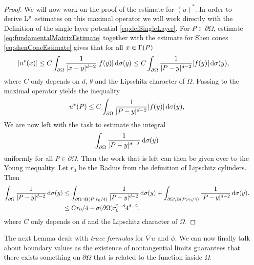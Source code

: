 \begin{proof}
  We will now work on the proof of the estimate for $(u)^*$.
  In order to derive $\mathrm{L}^p$ estimates on this maximal operator we will work directly with the Definition of the single layer potential \eqref{eq:defSingleLayer}.
  For $P \in \partial\Omega$, estimate \eqref{eq:fundamentalMatrixEstimate} together with the estimate for Shen cones \eqref{eq:shenConeEstimate} gives that for all $x \in \Gamma(P)$
  \begin{align*}
    |u^*(x)| 
    &\leq  C \int_{\partial\Omega} \frac{1}{|x - y|^{d - 2}} |f(y)| \, {\operatorname{d}\!{\sigma}}(y) 
    \leq  C \int_{\partial\Omega} \frac{1}{|P - y|^{d - 2}} |f(y)| \, {\operatorname{d}\!{\sigma}}(y),
  \end{align*}
  where $C$ only depends on $d$, $\theta$ and the Lipschitz character of $\Omega$.
  Passing to the maximal operator yields the inequality
  \begin{align*}
    u^*(P) \leq  C \int_{\partial\Omega} \frac{1}{|P - y|^{d - 2}} |f(y)| \, {\operatorname{d}\!{\sigma}}(y),
  \end{align*}
  We are now left with the task to estimate the integral 
  \begin{align*}
    \int_{\partial\Omega} \frac{1}{|P - y|^{d - 2}} \, {\operatorname{d}\!{\sigma}}(y)
  \end{align*}
  uniformly for all $P \in \partial\Omega$.
  Then the work that is left can then be given over to the Young inequality.
  Let $r_0$ be the Radius from the definition of Lipschitz cylinders.
  Then
  \begin{align*}
    \int_{\partial\Omega} \frac{1}{|P - y|^{d - 2}} \, {\operatorname{d}\!{\sigma}}(y)
    &\leq \int_{\partial\Omega \cap \mathrm{B}(P; r_0/4)} \frac{1}{|P - y|^{d - 2}} \, {\operatorname{d}\!{\sigma}}(y) + \int_{\partial\Omega \setminus \mathrm{B}(P; r_0/4)} \frac{1}{|P - y|^{d - 2}} \, {\operatorname{d}\!{\sigma}}(y). \\
    & \leq C r_0/4 +  \sigma(\partial\Omega) r_0^{2 - d} 4^{d - 2}.
  \end{align*}
  where $C$ only depends on $d$ and the Lipschitz character of $\Omega$.
\end{proof}

The next Lemma deals with \emph{trace formulas} for $\nabla u$ and $\phi$. We can now finally talk about boundary values as the existence of nontangential limits guarantees that there exists something on $\partial\Omega$ that is related to the function inside $\Omega$.

